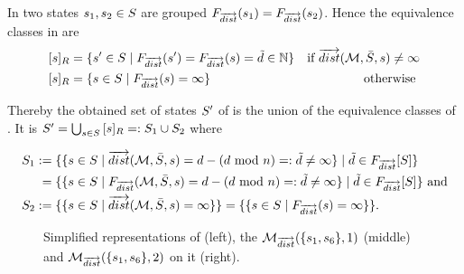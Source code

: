 \documentclass[preview]{standalone}
\begin{document}
In \viewdistance two states ${s}_1, {s}_2 \in {S}$ are grouped \iffN ${{F_{{{\overrightarrow{dist}}}}}}({s}_1) = {{F_{{{\overrightarrow{dist}}}}}}({s}_2)$. Hence the equivalence classes in \eqrelview are 
\begin{align*}
	{\ensuremath{{[{s}]_{{R}}}}} &= \{{s}' \in {S} \mid {\ensuremath{{F_{{{\overrightarrow{dist}}}}}}}({s}') = {{F_{{{\overrightarrow{dist}}}}}}({s}) = \tilde{d} \in {\mathbb{N}}\}  &\text{if } {\overrightarrow{dist}}({{{\mathcal{M}}}}, \bar{{S}}, {s}) \neq \infty \\
	{{[{s}]_{{R}}}} &= \{{s} \in {S} \mid {\ensuremath{{F_{{{\overrightarrow{dist}}}}}}}({s}) = \infty\} &\text{otherwise } 
\end{align*}

Thereby the obtained set of states ${S}'$ of \viewparamvalueseq is the union of the equivalence classes of \eqrelview. It is ${S}' = \bigcup_{{s} \in {S}} {{[{s}]_{{R}}}} =: {S}_1 \cup {S}_2$ where

\begin{align*}
	{S}_1 &:= \{\{{s} \in {S} \mid {\overrightarrow{dist}}({{{\mathcal{M}}}}, \bar{{S}}, {s}) = {d} - ({d} \text{ mod } n) =: \tilde{d} \neq \infty\} \mid \tilde{d} \in {\ensuremath{{F_{{{\overrightarrow{dist}}}}}}}[{S}]\} \\
	&\;= \{\{{s} \in {S} \mid {\ensuremath{{F_{{{\overrightarrow{dist}}}}}}}({{{\mathcal{M}}}}, \bar{{S}}, {s}) = {d} - ({d} \text{ mod } n) =: \tilde{d} \neq \infty\} \mid \tilde{d} \in {\ensuremath{{F_{{{\overrightarrow{dist}}}}}}}[{S}]\} \text{ and}\\
	{S}_2 &:= \{\{{s} \in {S}  \mid {\overrightarrow{dist}}({{{\mathcal{M}}}}, \bar{{S}}, {s}) = \infty\}\} = \{\{{s} \in {S} \mid {\ensuremath{{F_{{{\overrightarrow{dist}}}}}}}({s}) = \infty\}\}.
\end{align*}

\begin{figure}[h]
	\begin{minipage}{.45\textwidth}
		
	\end{minipage}%
	\begin{minipage}{.20\textwidth}
		
	\end{minipage}
	\hspace{-2mm}
	\begin{minipage}{.35\textwidth}
		
	\end{minipage}	
	\caption{Simplified representations of \mdp (left), the \viewsN ${{{{{\mathcal{M}}}}_{{{\overrightarrow{dist}}}}}}(\{{s}_1, {s}_6\}, 1)$ (middle) and ${{{{{\mathcal{M}}}}_{{{\overrightarrow{dist}}}}}}(\{{s}_1, {s}_6\}, 2)$ on it (right). }
	\label{fig:Distance}  
\end{figure}
\end{document}
